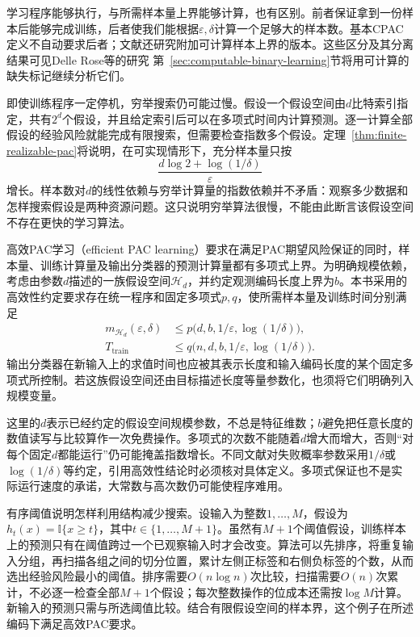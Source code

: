 学习程序能够执行，与所需样本量上界能够计算，也有区别。前者保证拿到一份样本后能够完成训练，后者使我们能根据$\varepsilon,\delta$计算一个足够大的样本数。基本CPAC定义不自动要求后者；文献还研究附加可计算样本上界的版本。这些区分及其分离结果可见Delle Rose等的研究 第~\ref{sec:computable-binary-learning}节将用可计算的缺失标记继续分析它们。

即使训练程序一定停机，穷举搜索仍可能过慢。假设一个假设空间由$d$比特索引指定，共有$2^d$个假设，并且给定索引后可以在多项式时间内计算预测。逐一计算全部假设的经验风险就能完成有限搜索，但需要检查指数多个假设。定理~\ref{thm:finite-realizable-pac}将说明，在可实现情形下，充分样本量只按
\[
 \frac{d\log2+\log(1/\delta)}{\varepsilon}
\]
增长。样本数对$d$的线性依赖与穷举计算量的指数依赖并不矛盾：观察多少数据和怎样搜索假设是两种资源问题。这只说明穷举算法很慢，不能由此断言该假设空间不存在更快的学习算法。

\begin{definition}[高效PAC学习]
\label{def:efficient-pac-learning}
高效PAC学习（efficient PAC learning）要求在满足PAC期望风险保证的同时，样本量、训练计算量及输出分类器的预测计算量都有多项式上界。为明确规模依赖，考虑由参数$d$描述的一族假设空间$\mathcal H_d$，并约定观测编码长度上界为$b$。本书采用的高效性约定要求存在统一程序和固定多项式$p,q$，使所需样本量及训练时间分别满足
\begin{equation}
 \begin{aligned}
 m_{\mathcal H_d}(\varepsilon,\delta)
 &\leq p\bigl(d,b,1/\varepsilon,\log(1/\delta)\bigr),\\
 T_{\mathrm{train}}
 &\leq q\bigl(n,d,b,1/\varepsilon,\log(1/\delta)\bigr).
 \end{aligned}
 \label{eq:efficient-pac-resources}
\end{equation}
输出分类器在新输入上的求值时间也应被其表示长度和输入编码长度的某个固定多项式所控制。若这族假设空间还由目标描述长度等量参数化，也须将它们明确列入规模变量。
\end{definition}

这里的$d$表示已经约定的假设空间规模参数，不总是特征维数；$b$避免把任意长度的数值读写与比较算作一次免费操作。多项式的次数不能随着$d$增大而增大，否则“对每个固定$d$都能运行”仍可能掩盖指数增长。不同文献对失败概率参数采用$1/\delta$或$\log(1/\delta)$等约定，引用高效性结论时必须核对具体定义。多项式保证也不是实际运行速度的承诺，大常数与高次数仍可能使程序难用。

有序阈值说明怎样利用结构减少搜索。设输入为整数$1,\ldots,M$，假设为$h_t(x)=\mathbb I\{x\geq t\}$，其中$t\in\{1,\ldots,M+1\}$。虽然有$M+1$个阈值假设，训练样本上的预测只有在阈值跨过一个已观察输入时才会改变。算法可以先排序，将重复输入分组，再扫描各组之间的切分位置，累计左侧正标签和右侧负标签的个数，从而选出经验风险最小的阈值。排序需要$O(n\log n)$次比较，扫描需要$O(n)$次累计，不必逐一检查全部$M+1$个假设；每次整数操作的位成本还需按$\log M$计算。新输入的预测只需与所选阈值比较。结合有限假设空间的样本界，这个例子在所述编码下满足高效PAC要求。

